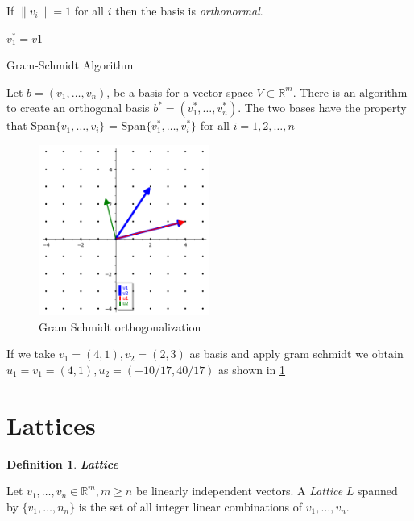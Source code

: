 \documentclass[a4paper,12pt]{report}
\newtheorem{definition}{Definition}[section]
\newcommand{\R}{\mathbb{R}}
\begin{document}
If $\lVert v_i \rVert = 1$ for all $i$ then the basis is \textit{orthonormal}.

\begin{algorithm}[H]
    \vspace*{5px}
    $v_1^* = v1$\;
    \\
    \caption{Gram-Schmidt Algorithm}
    \label{alg:gram_schmidt}
\end{algorithm}

Let $b = (v_1, \ldots, v_n)$, be a basis for a vector space $V \subset \R^m$. There is an algorithm to create an orthogonal basis
$b^* = (v_1^*,\ldots,v_n^*)$.
The two bases have the property that Span$\{v_1,\ldots,v_i\}$ = Span$\{v_1^*,\ldots,v_i^*\}$ for all $i = 1,2,\ldots,n$

\begin{figure}[htpb]
    \centering
    \includegraphics[width=0.5\textwidth]{./img/gram_schmidt.png}
    \caption{Gram Schmidt orthogonalization}
    \label{fig:gram_schmidt}
\end{figure}

If we take $v_1=(4, 1), v_2=(2, 3)$ as basis and apply gram schmidt we obtain $u_1=v_1=(4, 1), u_2=(-10/17, 40/17)$ as shown in \ref{fig:gram_schmidt}

\section{Lattices}

\begin{definition}
    \textbf{Lattice}
\end{definition}

Let $v_1,\ldots,v_n \in \R^m, m \ge n$ be linearly independent vectors. A \textit{Lattice} $L$ spanned by $\{v_1,\ldots,n_n\}$ is the set of 
all integer linear combinations of $v_1,\ldots,v_n$.
\end{document}
